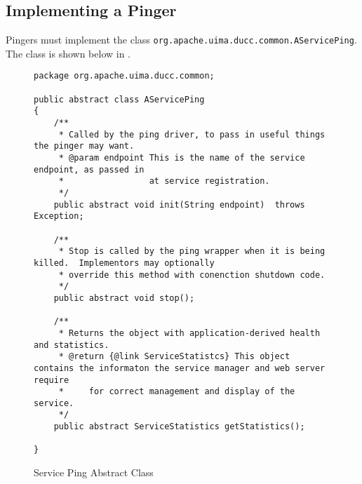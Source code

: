       \subsection{Implementing a Pinger}
      Pingers must implement the class {\tt org.apache.uima.ducc.common.AServicePing}.  The class
      is shown below in .
      \begin{figure}[H]
\begin{verbatim}
package org.apache.uima.ducc.common;

public abstract class AServicePing
{
    /**
     * Called by the ping driver, to pass in useful things the pinger may want.
     * @param endpoint This is the name of the service endpoint, as passed in
     *                 at service registration.
     */
    public abstract void init(String endpoint)  throws Exception;

    /**
     * Stop is called by the ping wrapper when it is being killed.  Implementors may optionally
     * override this method with conenction shutdown code.
     */
    public abstract void stop();

    /**
     * Returns the object with application-derived health and statistics.
     * @return {@link ServiceStatistcs} This object contains the informaton the service manager and web server require
     *     for correct management and display of the service.
     */
    public abstract ServiceStatistics getStatistics();
    
}
\end{verbatim}
        \caption{Service Ping Abstract Class}
        \label{fig:service.abstract.pinger}

      \end{figure}
      
